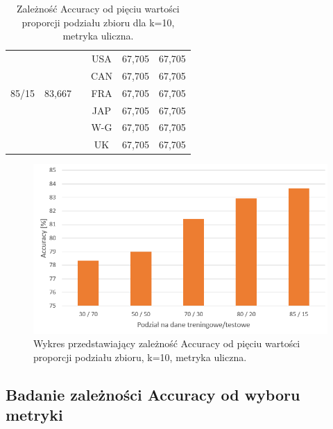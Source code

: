 \documentclass{classrep}
\begin{document}
\begin{table}[h!]
\begin{tabular} {c c c c c c}
		\hline
		&   			&\vline& USA & 67,705 & 67,705 \\
		&				&\vline& CAN & 67,705 & 67,705 \\
		85/15 & 83,667  &\vline& FRA & 67,705 & 67,705 \\
		&				&\vline& JAP & 67,705 & 67,705 \\
		&				&\vline& W-G & 67,705 & 67,705 \\
		&		 		&\vline& UK  & 67,705 & 67,705 \\
		\hline
		\hline
	\end{tabular}
	\caption{Zależność Accuracy od pięciu wartości proporcji podziału zbioru dla k=10, metryka uliczna. }
	\label{tabelaTT}
\end{table}

\begin{figure}[h!]
    \centering
    \includegraphics[width=1\textwidth]{accuracyTT.png}
    \caption{Wykres przedstawiający zależność Accuracy od pięciu wartości proporcji podziału zbioru, k=10, metryka uliczna.}
    \label{accuracyTT}
\end{figure}

\newpage
\subsection{Badanie zależności Accuracy od wyboru metryki}
\end{document}
